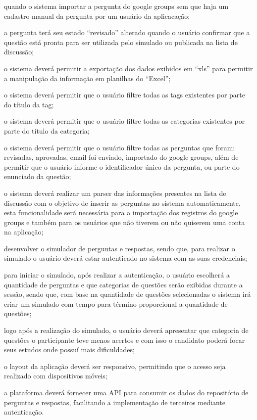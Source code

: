 \begin{alineas}
    quando o sistema importar a pergunta do google groups sem que haja um
    cadastro manual da pergunta por um usuário da aplicacação;
    \item a pergunta terá seu estado ``revisado'' alterado quando o usuário
    confirmar que a questão está pronta para ser utilizada pelo simulado ou
    publicada na lista de discussão;
    \item o sistema deverá permitir a exportação dos dados exibidos em ``xls''
    para permitir a manipulação da informação em planilhas do ``Excel'';
    \item o sistema deverá permitir que o usuário filtre todas as tags
    existentes por parte do título da tag;
    \item o sistema deverá permitir que o usuário filtre todas as categorias
    existentes por parte do título da categoria;
    \item o sistema deverá permitir que o usuário filtre todas as perguntas que
    foram: revisadas, aprovadas, email foi enviado, importado do google groups,
    além de permitir que o usuário informe o identificador único da pergunta, ou
    parte do enunciado da questão;
    \item o sistema deverá realizar um parser das informações presentes na lista
    de discussão com o objetivo de inserir as perguntas no sistema
    automaticamente, esta funcionalidade será necessária para a importação dos
    registros do google groups e também para os usuários que não tiverem ou não
    quiserem uma conta na aplicação;
    \item desenvolver o simulador de perguntas e respostas, sendo que, para
    realizar o simulado o usuário deverá estar autenticado no sistema com as
    suas credenciais;
    \item para iniciar o simulado, após realizar a autenticação, o usuário
    escolherá a quantidade de perguntas e que categorias de questões serão
    exibidas durante a sessão, sendo que, com base na quantidade de questões
    selecionadas o sistema irá criar um simulado com tempo para término
    proporcional a quantidade de questões;
    \item logo após a realização do simulado, o usuário deverá apresentar que 
    categoria de questões o participante teve menos acertos e com isso o
    candidato poderá focar seus estudos onde possuí mais dificuldades;
    \item o layout da aplicação deverá ser responsivo, permitindo que o acesso
    seja realizado com dispositivos móveis;
    \item a plataforma deverá fornecer uma \acs{API} para consumir os dados do
    repositório de perguntas e respostas, facilitando a implementação de
    terceiros mediante autenticação.
\end{alineas}
